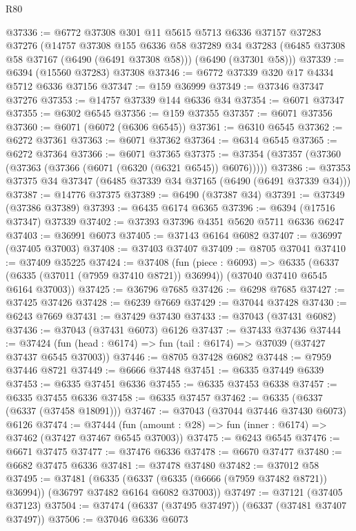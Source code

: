 \begin{lexlean}{R80}
\begin{coremodule}
@37336 := @6772
    @37308
    @301
    @11
    @5615
    @5713
    @6336
    @37157
    @37283
    @37276
    (@14757
      @37308
      @155
      @6336
      @58
      @37289
      @34
      @37283
      (@6485 @37308 @58 @37167 (@6490 (@6491 @37308 @58)))
      (@6490 (@37301 @58)))
@37339 := @6394 (@15560 @37283) @37308
@37346 := @6772 @37339 @320 @17 @4334 @5712 @6336 @37156
@37347 := @159 @36999
@37349 := @37346 @37347 @37276
@37353 := @14757 @37339 @144 @6336 @34
@37354 := @6071 @37347
@37355 := @6302 @6545
@37356 := @159 @37355
@37357 := @6071 @37356
@37360 := @6071 (@6072 (@6306 @6545))
@37361 := @6310 @6545
@37362 := @6272 @37361
@37363 := @6071 @37362
@37364 := @6314 @6545
@37365 := @6272 @37364
@37366 := @6071 @37365
@37375 := @37354 (@37357 (@37360 (@37363 (@37366 (@6071 (@6320 (@6321 @6545)) @6076)))))
@37386 := @37353 @37375 @34 @37347 (@6485 @37339 @34 @37165 (@6490 (@6491 @37339 @34)))
@37387 := @14776 @37375
@37389 := @6490 (@37387 @34)
@37391 := @37349 (@37386 @37389)
@37393 := @6435 @6174 @6365
@37396 := @6394 (@17516 @37347) @37339
@37402 := @37393 @37396 @4351 @5620 @5711 @6336 @6247
@37403 := @36991 @6073
@37405 := @37143 @6164 @6082
@37407 := @36997 (@37405 @37003)
@37408 := @37403 @37407
@37409 := @8705 @37041
@37410 := @37409 @35225
@37424 := @37408
    (fun (piece : @6093) =>
    @6335 (@6337 (@6335 (@37011 (@7959 @37410 @8721)) @36994)) (@37040 @37410 @6545 @6164 @37003))
@37425 := @36796 @7685
@37426 := @6298 @7685
@37427 := @37425 @37426
@37428 := @6239 @7669
@37429 := @37044 @37428
@37430 := @6243 @7669
@37431 := @37429 @37430
@37433 := @37043 (@37431 @6082)
@37436 := @37043 (@37431 @6073) @6126
@37437 := @37433 @37436
@37444 := @37424 (fun (head : @6174) => fun (tail : @6174) => @37039 (@37427 @37437 @6545 @37003))
@37446 := @8705 @37428 @6082
@37448 := @7959 @37446 @8721
@37449 := @6666 @37448
@37451 := @6335 @37449 @6339
@37453 := @6335 @37451 @6336
@37455 := @6335 @37453 @6338
@37457 := @6335 @37455 @6336
@37458 := @6335 @37457
@37462 := @6335 (@6337 (@6337 (@37458 @18091)))
@37467 := @37043 (@37044 @37446 @37430 @6073) @6126
@37474 := @37444 (fun (amount : @28) => fun (inner : @6174) => @37462 (@37427 @37467 @6545 @37003))
@37475 := @6243 @6545
@37476 := @6671 @37475
@37477 := @37476 @6336
@37478 := @6670 @37477
@37480 := @6682 @37475 @6336
@37481 := @37478 @37480
@37482 := @37012 @58
@37495 := @37481
    (@6335 (@6337 (@6335 (@6666 (@7959 @37482 @8721)) @36994)) (@36797 @37482 @6164 @6082 @37003))
@37497 := @37121 (@37405 @37123)
@37504 := @37474 (@6337 (@37495 @37497)) (@6337 (@37481 @37407 @37497))
@37506 := @37046 @6336 @6073

\end{coremodule}
\end{lexlean}
